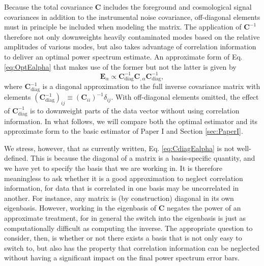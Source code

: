 \documentclass[twocolumn,aps,prd,nofootinbib,showpacs]{revtex4-1}
\begin{document}
Because the total covariance $\mathbf{C}$ includes the foreground and cosmological signal covariances in addition to the instrumental noise covariance, off-diagonal elements must in principle be included when modeling the matrix.  The application of $\mathbf{C}^{-1}$ therefore not only downweights heavily contaminated modes based on the relative amplitudes of various modes, but also takes advantage of correlation information to deliver an optimal power spectrum estimate.  An approximate form of Eq. \eqref{eq:OptEalpha} that makes use of the former but not the latter is given by
\begin{equation}
\label{eq:CdiagEalpha}
\mathbf{E}_\alpha \propto \mathbf{C}^{-1}_\textrm{diag} \mathbf{C}_{,\alpha} \mathbf{C}^{-1}_\textrm{diag},
\end{equation}
where $\mathbf{C}^{-1}_\textrm{diag}$ is a diagonal approximation to the full inverse covariance matrix with elements $(\mathbf{C}_\textrm{diag}^{-1})_{ij} \equiv (\mathbf{C}_{ii})^{-1} \delta_{ij}$.  With off-diagonal elements omitted, the effect of $\mathbf{C}^{-1}_\textrm{diag}$ is to downweight parts of the data vector without using correlation information.  In what follows, we will compare both the optimal estimator and its approximate form to the basic estimator of Paper I and Section \ref{sec:PaperI}.

We stress, however, that as currently written, Eq. \eqref{eq:CdiagEalpha} is not well-defined.  This is because the diagonal of a matrix is a basis-specific quantity, and we have yet to specify the basis that we are working in.  It is therefore meaningless to ask whether it is a good approximation to neglect correlation information, for data that is correlated in one basis may be uncorrelated in another.  For instance, any matrix is (by construction) diagonal in its own eigenbasis.  However, working in the eigenbasis of $\mathbf{C}$ negates the power of an approximate treatment, for in general the switch into the eigenbasis is just as computationally difficult as computing the inverse.  The appropriate question to consider, then, is whether or not there exists a basis that is not only easy to switch to, but also has the property that correlation information can be neglected without having a significant impact on the final power spectrum error bars.
\end{document}
